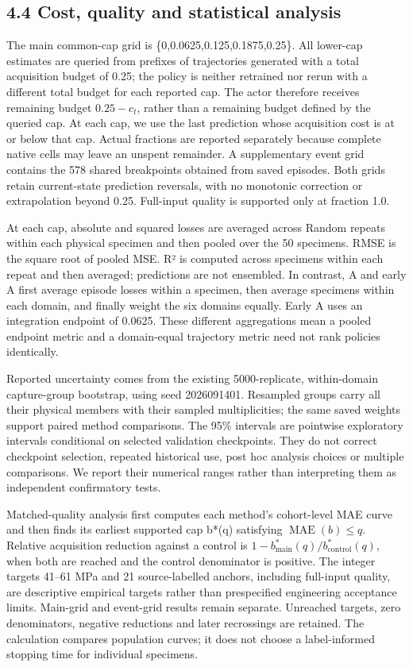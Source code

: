 \hypertarget{cost-quality-and-statistical-analysis}{%
\subsection{4.4 Cost, quality and statistical analysis}\label{cost-quality-and-statistical-analysis}}

The main common-cap grid is \{0,0.0625,0.125,0.1875,0.25\}. All lower-cap estimates are queried from prefixes of trajectories generated with a total acquisition budget of 0.25; the policy is neither retrained nor rerun with a different total budget for each reported cap. The actor therefore receives remaining budget \(0.25-c_t\), rather than a remaining budget defined by the queried cap. At each cap, we use the last prediction whose acquisition cost is at or below that cap. Actual fractions are reported separately because complete native cells may leave an unspent remainder. A supplementary event grid contains the 578 shared breakpoints obtained from saved episodes. Both grids retain current-state prediction reversals, with no monotonic correction or extrapolation beyond 0.25. Full-input quality is supported only at fraction 1.0.

At each cap, absolute and squared losses are averaged across Random repeats within each physical specimen and then pooled over the 50 specimens. RMSE is the square root of pooled MSE. R² is computed across specimens within each repeat and then averaged; predictions are not ensembled. In contrast, A and early A first average episode losses within a specimen, then average specimens within each domain, and finally weight the six domains equally. Early A uses an integration endpoint of 0.0625. These different aggregations mean a pooled endpoint metric and a domain-equal trajectory metric need not rank policies identically.

Reported uncertainty comes from the existing 5000-replicate, within-domain capture-group bootstrap, using seed 2026091401. Resampled groups carry all their physical members with their sampled multiplicities; the same saved weights support paired method comparisons. The 95\% intervals are pointwise exploratory intervals conditional on selected validation checkpoints. They do not correct checkpoint selection, repeated historical use, post hoc analysis choices or multiple comparisons. We report their numerical ranges rather than interpreting them as independent confirmatory tests.

Matched-quality analysis first computes each method's cohort-level MAE curve and then finds its earliest supported cap b*(q) satisfying \(\operatorname{MAE}(b)\le q\). Relative acquisition reduction against a control is \(1-b^*_{\mathrm{main}}(q)/b^*_{\mathrm{control}}(q)\), when both are reached and the control denominator is positive. The integer targets 41--61 MPa and 21 source-labelled anchors, including full-input quality, are descriptive empirical targets rather than prespecified engineering acceptance limits. Main-grid and event-grid results remain separate. Unreached targets, zero denominators, negative reductions and later recrossings are retained. The calculation compares population curves; it does not choose a label-informed stopping time for individual specimens.
